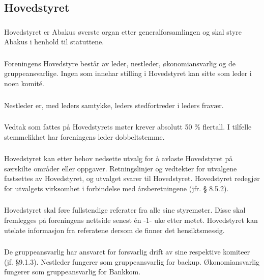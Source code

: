 \subsection{Hovedstyret}

\subsubsection{}
Hovedstyret er Abakus øverste organ etter generalforsamlingen og skal styre
Abakus i henhold til statuttene.

\subsubsection{}
Foreningens Hovedstyre består av leder, nestleder, økonomiansvarlig og de
gruppeansvarlige. Ingen som innehar stilling i Hovedstyret kan sitte som leder i noen komité.

\subsubsection{}
Nestleder er, med leders samtykke, leders stedfortreder i leders fravær.

\subsubsection{}
Vedtak som fattes på Hovedstyrets møter krever absolutt 50 \% flertall. I
tilfelle stemmelikhet har foreningens leder dobbeltstemme.

\subsubsection{}
Hovedstyret kan etter behov nedsette utvalg for å avlaste Hovedstyret på
særskilte områder eller oppgaver. Retningslinjer og vedtekter for utvalgene
fastsettes av Hovedstyret, og utvalget svarer til Hovedstyret. Hovedstyret
redegjør for utvalgets virksomhet i forbindelse med årsberetningene (jfr. §
8.5.2).

\subsubsection{}
Hovedstyret skal føre fullstendige referater fra alle sine styremøter. Disse
skal fremlegges på foreningens nettside senest én -1- uke etter møtet.
Hovedstyret kan utelate informasjon fra referatene dersom de finner det
hensiktsmessig.

\subsubsection{}
De gruppeansvarlig har ansvaret for forsvarlig drift av sine respektive komiteer (jf. §9.1.3).
Nestleder fungerer som gruppeansvarlig for backup. Økonomiansvarlig fungerer som
gruppeansvarlig for Bankkom.

